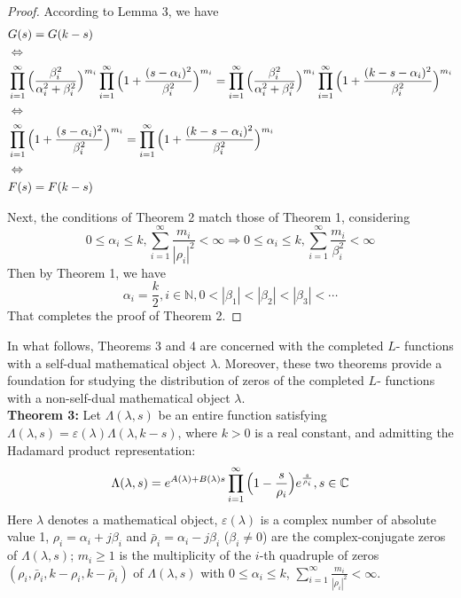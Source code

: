 \documentclass[12pt]{article}
\begin{document}
\begin{proof}
According to Lemma 3, we have
\begin{equation}\begin{split}
&G(s)=G(k-s)\\
&\Leftrightarrow\\
&\prod_{i=1}^{\infty} \Big{(}\frac{\beta_i^2}{\alpha_i^2 + \beta_i^2}\Big{)}^{m_i}\prod_{i=1}^{\infty} \Big{(}1+\frac{(s-\alpha_i)^2}{\beta_i^2}\Big{)}^{m_i}=\prod_{i=1}^{\infty} \Big{(}\frac{\beta_i^2}{\alpha_i^2 + \beta_i^2}\Big{)}^{m_i}\prod_{i=1}^{\infty} \Big{(}1+\frac{(k-s-\alpha_i)^2}{\beta_i^2}\Big{)}^{m_i}\\
&\Leftrightarrow\\
&\prod_{i=1}^{\infty} \Big{(}1+\frac{(s-\alpha_i)^2}{\beta_i^2}\Big{)}^{m_i}=\prod_{i=1}^{\infty} \Big{(}1+\frac{(k-s-\alpha_i)^2}{\beta_i^2}\Big{)}^{m_i}\\
&\Leftrightarrow\\
&F(s)=F(k-s)\\
\end{split}\end{equation}

Next, the conditions of Theorem 2 match those of Theorem 1, considering
$$0 \leq \alpha_i \leq k, \displaystyle\sum_{i=1}^{\infty}\frac{m_i}{|\rho_i|^2}<\infty\Rightarrow 0\leq \alpha_i \leq k, \displaystyle\sum_{i=1}^{\infty}\frac{m_i}{\beta_i^2}<\infty$$
Then by Theorem 1, we have
\begin{equation}
 \alpha_i=\frac{k}{2}, i\in\mathbb{N}, 0<|\beta_1|<|\beta_2|<|\beta_3|<\cdots
\end{equation}
That completes the proof of Theorem 2.
\end{proof}

 In what follows, Theorems 3 and 4 are concerned with the completed $L$- functions with a self-dual mathematical object $\lambda$. Moreover, these two theorems provide a foundation for studying the distribution of zeros of the completed $L$- functions with a non-self-dual mathematical object $\lambda$.\\

\textbf{Theorem 3:} Let $\Lambda(\lambda, s)$ be an entire function satisfying $\Lambda(\lambda, s)=\varepsilon(\lambda)\Lambda(\lambda, k-s)$, where $k >0 $ is a real constant, and admitting the Hadamard product representation:
\begin{equation}
\Lambda(\lambda, s)=e^{A(\lambda)+B(\lambda)s}\prod_{i=1}^{\infty}\Big{(}1-\frac{s}{\rho_i}\Big{)}e^{\frac{s}{\rho_i}}, s \in \mathbb{C}
\end{equation}
 Here $\lambda$ denotes a mathematical object, $\varepsilon(\lambda)$ is a complex number of absolute value 1, $\rho_i=\alpha_i+j\beta_i$ and $\bar\rho_i=\alpha_i-j\beta_i$ ($\beta_i\neq 0$)
      are the complex-conjugate zeros of $\Lambda(\lambda, s)$; $m_i \geq 1$ is the multiplicity of the $i$-th quadruple of zeros $(\rho_i, \bar\rho_i, k-\rho_i, k-\bar\rho_i)$ of $\Lambda(\lambda, s)$ with $0 \leq \alpha_i \leq k$, $\sum_{i=1}^{\infty}\frac{m_i}{|\rho_i|^2}<\infty$.
\end{document}
